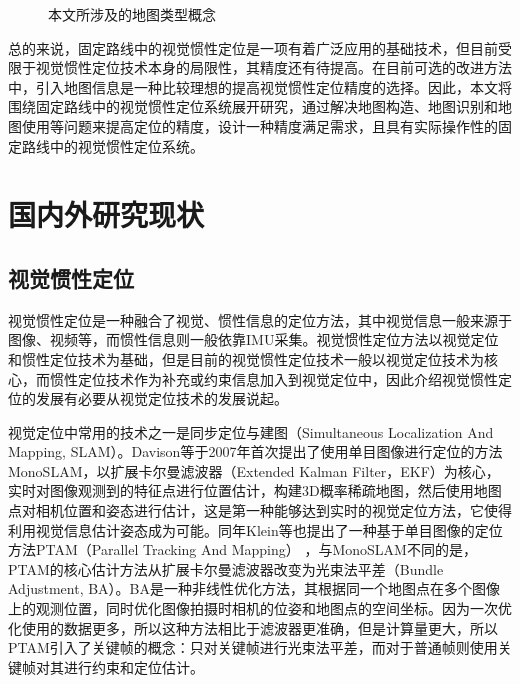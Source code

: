 \begin{figure}
  \centering
  \caption{本文所涉及的地图类型概念}
  \label{fig:maps}
\end{figure}

总的来说，固定路线中的视觉惯性定位是一项有着广泛应用的基础技术，但目前受限于视觉惯性定位技术本身的局限性，其精度还有待提高。在目前可选的改进方法中，引入地图信息是一种比较理想的提高视觉惯性定位精度的选择。因此，本文将围绕固定路线中的视觉惯性定位系统展开研究，通过解决地图构造、地图识别和地图使用等问题来提高定位的精度，设计一种精度满足需求，且具有实际操作性的固定路线中的视觉惯性定位系统。

\section{国内外研究现状}
\subsection{视觉惯性定位}

视觉惯性定位是一种融合了视觉、惯性信息的定位方法，其中视觉信息一般来源于图像、视频等，而惯性信息则一般依靠IMU采集。视觉惯性定位方法以视觉定位和惯性定位技术为基础，但是目前的视觉惯性定位技术一般以视觉定位技术为核心，而惯性定位技术作为补充或约束信息加入到视觉定位中，因此介绍视觉惯性定位的发展有必要从视觉定位技术的发展说起。

视觉定位中常用的技术之一是同步定位与建图（Simultaneous Localization And Mapping, SLAM）。Davison等\cite{davison2007monoslam}于2007年首次提出了使用单目图像进行定位的方法MonoSLAM，以扩展卡尔曼滤波器（Extended Kalman Filter，EKF）为核心，实时对图像观测到的特征点进行位置估计，构建3D概率稀疏地图，然后使用地图点对相机位置和姿态进行估计，这是第一种能够达到实时的视觉定位方法，它使得利用视觉信息估计姿态成为可能。同年Klein等\cite{klein2007parallel}也提出了一种基于单目图像的定位方法PTAM（Parallel Tracking And Mapping） ，与MonoSLAM不同的是，PTAM的核心估计方法从扩展卡尔曼滤波器改变为光束法平差（Bundle Adjustment, BA）\cite{triggs2000bundle}。BA是一种非线性优化方法，其根据同一个地图点在多个图像上的观测位置，同时优化图像拍摄时相机的位姿和地图点的空间坐标。因为一次优化使用的数据更多，所以这种方法相比于滤波器更准确，但是计算量更大，所以PTAM引入了关键帧的概念：只对关键帧进行光束法平差，而对于普通帧则使用关键帧对其进行约束和定位估计。

